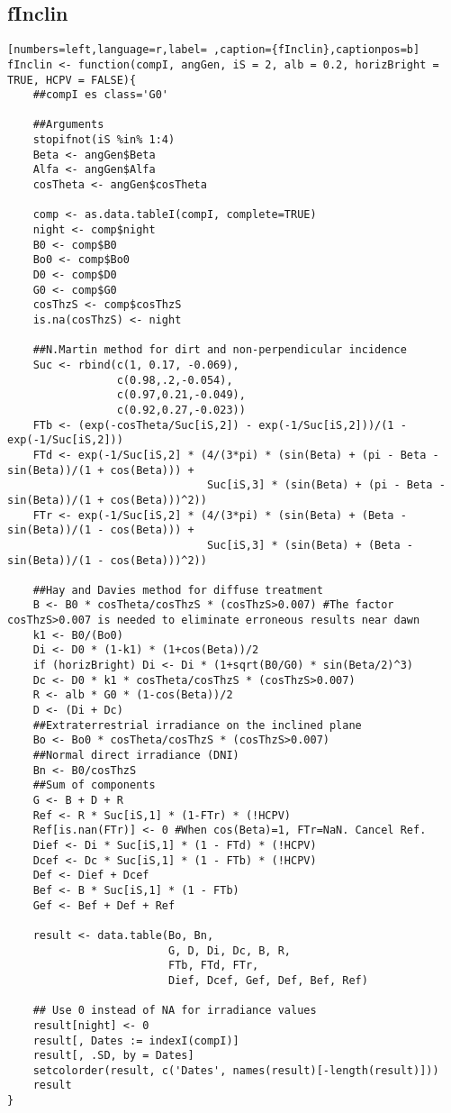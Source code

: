 \subsection{fInclin}
\label{sec:org89ce615}
\begin{lstlisting}[numbers=left,language=r,label= ,caption={fInclin},captionpos=b]
fInclin <- function(compI, angGen, iS = 2, alb = 0.2, horizBright = TRUE, HCPV = FALSE){
    ##compI es class='G0'

    ##Arguments
    stopifnot(iS %in% 1:4)
    Beta <- angGen$Beta
    Alfa <- angGen$Alfa
    cosTheta <- angGen$cosTheta

    comp <- as.data.tableI(compI, complete=TRUE)
    night <- comp$night
    B0 <- comp$B0
    Bo0 <- comp$Bo0
    D0 <- comp$D0
    G0 <- comp$G0
    cosThzS <- comp$cosThzS
    is.na(cosThzS) <- night

    ##N.Martin method for dirt and non-perpendicular incidence
    Suc <- rbind(c(1, 0.17, -0.069),
                 c(0.98,.2,-0.054),
                 c(0.97,0.21,-0.049),
                 c(0.92,0.27,-0.023))
    FTb <- (exp(-cosTheta/Suc[iS,2]) - exp(-1/Suc[iS,2]))/(1 - exp(-1/Suc[iS,2]))
    FTd <- exp(-1/Suc[iS,2] * (4/(3*pi) * (sin(Beta) + (pi - Beta - sin(Beta))/(1 + cos(Beta))) +
                               Suc[iS,3] * (sin(Beta) + (pi - Beta - sin(Beta))/(1 + cos(Beta)))^2))
    FTr <- exp(-1/Suc[iS,2] * (4/(3*pi) * (sin(Beta) + (Beta - sin(Beta))/(1 - cos(Beta))) +
                               Suc[iS,3] * (sin(Beta) + (Beta - sin(Beta))/(1 - cos(Beta)))^2))

    ##Hay and Davies method for diffuse treatment
    B <- B0 * cosTheta/cosThzS * (cosThzS>0.007) #The factor cosThzS>0.007 is needed to eliminate erroneous results near dawn
    k1 <- B0/(Bo0)
    Di <- D0 * (1-k1) * (1+cos(Beta))/2
    if (horizBright) Di <- Di * (1+sqrt(B0/G0) * sin(Beta/2)^3)
    Dc <- D0 * k1 * cosTheta/cosThzS * (cosThzS>0.007)
    R <- alb * G0 * (1-cos(Beta))/2
    D <- (Di + Dc)
    ##Extraterrestrial irradiance on the inclined plane
    Bo <- Bo0 * cosTheta/cosThzS * (cosThzS>0.007) 
    ##Normal direct irradiance (DNI)
    Bn <- B0/cosThzS
    ##Sum of components
    G <- B + D + R
    Ref <- R * Suc[iS,1] * (1-FTr) * (!HCPV)
    Ref[is.nan(FTr)] <- 0 #When cos(Beta)=1, FTr=NaN. Cancel Ref.
    Dief <- Di * Suc[iS,1] * (1 - FTd) * (!HCPV)
    Dcef <- Dc * Suc[iS,1] * (1 - FTb) * (!HCPV)
    Def <- Dief + Dcef
    Bef <- B * Suc[iS,1] * (1 - FTb)
    Gef <- Bef + Def + Ref

    result <- data.table(Bo, Bn,
                         G, D, Di, Dc, B, R,
                         FTb, FTd, FTr,
                         Dief, Dcef, Gef, Def, Bef, Ref) 

    ## Use 0 instead of NA for irradiance values
    result[night] <- 0
    result[, Dates := indexI(compI)]
    result[, .SD, by = Dates]
    setcolorder(result, c('Dates', names(result)[-length(result)]))
    result
}
\end{lstlisting}

